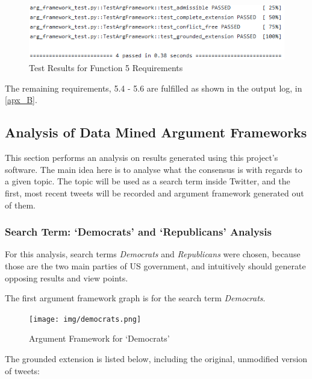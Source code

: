             \begin{figure}[!htbp]
                \centering
                \includegraphics[scale=0.9]{img/arg_framework_test.png}
                \caption{Test Results for Function 5 Requirements}
                \label{fig:testres5}
            \end{figure}
            \FloatBarrier
            
            The remaining requirements, 5.4 - 5.6 are fulfilled as shown in the output log, in \cref{apx_B}.
            
    \subsection{Analysis of Data Mined Argument Frameworks} \label{analysis}
        This section performs an analysis on results generated using this project's software. The main idea here is to analyse what the consensus is with regards to a given topic. The topic will be used as a search term inside Twitter, and the first, most recent tweets will be recorded and argument framework generated out of them.
        
        \subsubsection{Search Term: `Democrats' and `Republicans' Analysis} \label{usaanalysis}
            For this analysis, search terms \textit{Democrats} and \textit{Republicans} were chosen, because those are the two main parties of US government, and intuitively should generate opposing results and view points.
            
            The first argument framework graph is for the search term \textit{Democrats}.
            \begin{figure}[!ht]
                \centering
                \texttt{[image: img/democrats.png]}
                \caption{Argument Framework for `Democrats'}
                \label{fig:demnocrat}
            \end{figure}
            \FloatBarrier
            
            The grounded extension is listed below, including the original, unmodified version of tweets:
            
